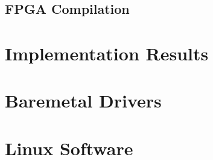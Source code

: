 \documentclass{ug}
\begin{document}
\ifdefined\FPGACOMP
\subsection{FPGA Compilation}
\label{sec:fpga}

\fi

\ifdefined\RESULTS
\ifdefined\SECTIONCLEARPAGE
\clearpage
\fi
\section{Implementation Results}
\label{sec:results}

\fi

\ifdefined\DOXYGEN
\section{Baremetal Drivers}
\label{sec:baremetal}

\fi

\ifdefined\LINUX
\section{Linux Software}
\label{sec:linux}

\fi

\ifdefined\CUSTOM

\fi
\end{document}
